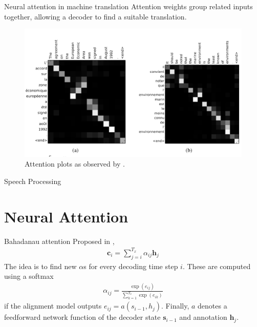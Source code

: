 \documentclass{beamer}
\begin{document}
    \begin{frame}{Neural attention in machine translation}
      Attention weights group related inputs together,
      allowing a decoder to find a suitable translation.
      \begin{figure}
      \includegraphics[scale=0.2]{./figures/attention.png}
      \caption{Attention plots as observed by \cite{Bahdanau2015NeuralMT}.}
      \end{figure}
    \end{frame}

    \begin{frame}{Speech Processing \cite{chan2015listen}}
      \begin{figure}
        
      \end{figure}
    \end{frame}

    \section{Neural Attention}
    \begin{frame}{Bahadanau attention}
      Proposed in \cite{Bahdanau2015NeuralMT},
      \begin{align}
        \mathbf{c}_i = \sum_{j=i}^{T_x} \alpha_{ij} \mathbf{h}_j
      \end{align}
      The idea is to find new $\alpha$s for every decoding time step $i$. 
      These are computed using a softmax 
      \begin{align}
        \alpha_{ij} = \frac{\exp(e_{ij})}{\sum_{k=1}^{T_x} \exp(e_{ik})}
      \end{align}
      if the alignment model outputs $e_{ij} = a(s_{i-1}, h_j)$.
      Finally, $a$ denotes a feedforward network function of the decoder state $\mathbf{s}_{i-1}$ and annotation $\mathbf{h}_j$.
    \end{frame}
\end{document}
